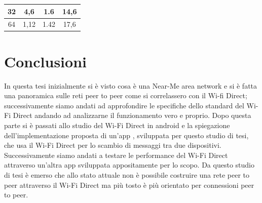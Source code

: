 \begin{table}
\begin{tabular}{|c|c|c|c|}
   32                                                            & 4,6                                                                       & 1.6                                                                                & 14,6                                                                                          \\ \hline
   64                                                            & 1,12                                                                      & 1.42                                                                               & 17,6                                                                                          \\ \hline
   \end{tabular}
   \end{table}

   \chapter*{Conclusioni}
   In questa tesi inizialmente si è visto cosa è una Near-Me area network e
   si è fatta una panoramica sulle reti peer to peer come si correlassero 
   con il Wi-fi Direct; successivamente siamo andati ad approfondire le specifiche
   dello standard del Wi-Fi Direct andando ad analizzarne il
    funzionamento vero e proprio.
   Dopo questa parte si è passati allo studio del Wi-Fi Direct
   in android e la spiegazione dell'implementazione
   proposta di un'app , sviluppata per questo studio di tesi,
   che usa il Wi-Fi Direct per lo scambio di messaggi
   tra due dispositivi.
   Successivamente siamo andati a testare le performance del Wi-Fi Direct
   attraverso un'altra app sviluppata appositamente per lo scopo.
   Da questo studio di tesi è emerso che allo stato attuale
   non è possibile costruire una rete peer to peer
   attraverso il Wi-Fi Direct ma più tosto è più orientato
   per connessioni peer to peer.







